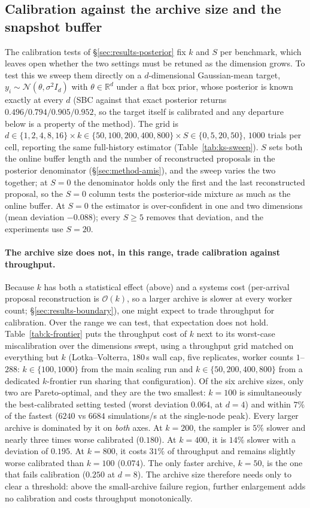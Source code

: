 \documentclass[10pt]{article}
\theoremstyle{plain}
\theoremstyle{definition}
\begin{document}
\subsection{Calibration against the archive size and the snapshot buffer}
The calibration tests of \S\ref{sec:results-posterior} fix $k$ and $S$ per benchmark, which leaves open whether the two settings must be retuned as the dimension grows. To test this we sweep them directly on a $d$-dimensional Gaussian-mean target, $y_i\sim\mathcal N(\theta,\sigma^2 I_d)$ with $\theta\in\mathbb R^d$ under a flat box prior, whose posterior is known exactly at every $d$ (SBC against that exact posterior returns $0.496/0.794/0.905/0.952$, so the target itself is calibrated and any departure below is a property of the method). The grid is $d\in\{1,2,4,8,16\}\times k\in\{50,100,200,400,800\}\times S\in\{0,5,20,50\}$, $1000$ trials per cell, reporting the same full-history estimator (Table~\ref{tab:ks-sweep}). $S$ sets both the online buffer length and the number of reconstructed proposals in the posterior denominator (\S\ref{sec:method-amis}), and the sweep varies the two together; at $S=0$ the denominator holds only the first and the last reconstructed proposal, so the $S=0$ column tests the posterior-side mixture as much as the online buffer. At $S=0$ the estimator is over-confident in one and two dimensions (mean deviation $-0.088$); every $S\ge5$ removes that deviation, and the experiments use $S=20$.

\paragraph{The archive size does not, in this range, trade calibration against throughput.} Because $k$ has both a statistical effect (above) and a systems cost (per-arrival proposal reconstruction is $\mathcal{O}(k)$, so a larger archive is slower at every worker count; \S\ref{sec:results-boundary}), one might expect to trade throughput for calibration. Over the range we can test, that expectation does not hold. Table~\ref{tab:k-frontier} puts the throughput cost of $k$ next to its worst-case miscalibration over the dimensions swept, using a throughput grid matched on everything but $k$ (Lotka--Volterra, $180$\,s wall cap, five replicates, worker counts $1$--$288$: $k\in\{100,1000\}$ from the main scaling run and $k\in\{50,200,400,800\}$ from a dedicated $k$-frontier run sharing that configuration). Of the six archive sizes, only two are Pareto-optimal, and they are the two smallest: $k=100$ is simultaneously the best-calibrated setting tested (worst deviation $0.064$, at $d=4$) and within $7\%$ of the fastest ($6240$ vs $6684$ simulations/s at the single-node peak). Every larger archive is dominated by it on \emph{both} axes. At $k=200$, the sampler is $5\%$ slower and nearly three times worse calibrated ($0.180$). At $k=400$, it is $14\%$ slower with a deviation of $0.195$. At $k=800$, it costs $31\%$ of throughput and remains slightly worse calibrated than $k=100$ ($0.074$). The only faster archive, $k=50$, is the one that fails calibration ($0.250$ at $d=8$). The archive size therefore needs only to clear a threshold: above the small-archive failure region, further enlargement adds no calibration and costs throughput monotonically.
\end{document}
